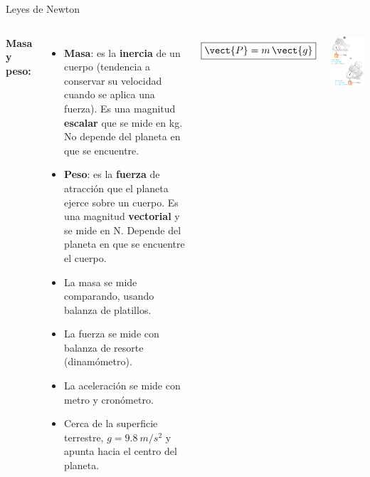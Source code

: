 \documentclass[9pt, aspectratio=169]{beamer}
\begin{document}
\begin{frame}{Leyes de Newton}
\begin{columns}
    \textbf{Masa y peso:}
    \begin{itemize}
        \item \textbf{Masa}: es la \textbf{inercia} de un cuerpo (tendencia a conservar su velocidad cuando se aplica una fuerza). Es una magnitud \textbf{escalar} que se mide en \unit{kg}. No depende del planeta en que se encuentre.
        \item \textbf{Peso}: es la \textbf{fuerza} de atracción que el planeta ejerce sobre un cuerpo. Es una magnitud \textbf{vectorial} y se mide en \unit{N}. Depende del planeta en que se encuentre el cuerpo.
        \item La masa se mide comparando, usando balanza de platillos.
        \item La fuerza se mide con balanza de resorte (dinamómetro).
        \item La aceleración se mide con metro y cronómetro.
        \item Cerca de la superficie terrestre, $g = \qty{9.8}{m/s^2}$ y apunta hacia el centro del planeta.
    \end{itemize}
    \[ \boxed{ \vect{P} = m \, \vect{g} } \]
\begin{center}
    \includegraphics[scale=0.34]{figs/fig-09}\\

\end{center}
\end{columns}
\end{frame}
\end{document}
